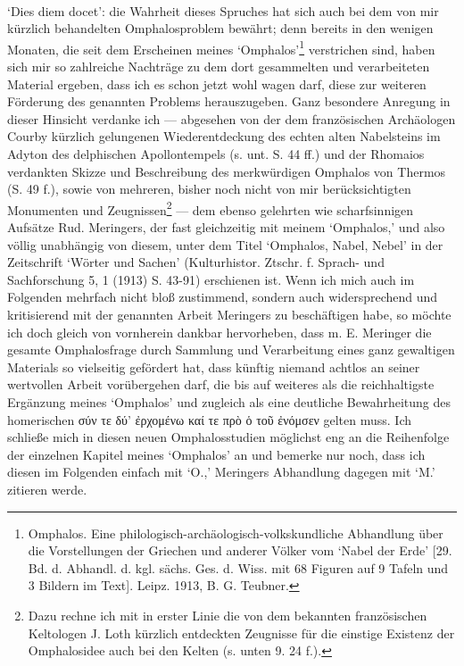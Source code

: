 \documentclass[a4paper, 11pt, oneside]{article}
\begin{document}
\paragraph{}
`Dies diem docet': die Wahrheit dieses Spruches hat sich auch bei dem von mir kürzlich behandelten Omphalosproblem bewährt; denn bereits in den wenigen Monaten, die seit dem Erscheinen meines `Omphalos'\footnote{Omphalos. Eine philologisch-archäologisch-volkskundliche Abhandlung über die Vorstellungen der Griechen und anderer Völker vom `Nabel der Erde' [29. Bd. d. Abhandl. d. kgl. sächs. Ges. d. Wiss. mit 68 Figuren auf 9 Tafeln und 3 Bildern im Text]. Leipz. 1913, B. G. Teubner.} verstrichen sind, haben sich mir so zahlreiche Nachträge zu dem dort gesammelten und verarbeiteten Material ergeben, dass ich es schon jetzt wohl wagen darf, diese zur weiteren Förderung des genannten Problems herauszugeben. Ganz besondere Anregung in dieser Hinsicht verdanke ich --- abgesehen von der dem französischen Archäologen Courby kürzlich gelungenen Wiederentdeckung des echten alten Nabelsteins im Adyton des delphischen Apollontempels (s. unt. S. 44 ff.) und der Rhomaios verdankten Skizze und Beschreibung des merkwürdigen Omphalos von Thermos (S. 49 f.), sowie von mehreren, bisher noch nicht von mir berücksichtigten Monumenten und Zeugnissen\footnote{Dazu rechne ich mit in erster Linie die von dem bekannten französischen Keltologen J. Loth kürzlich entdeckten Zeugnisse für die einstige Existenz der Omphalosidee auch bei den Kelten (s. unten 9. 24 f.).} --- dem ebenso gelehrten wie scharfsinnigen Aufsätze Rud. Meringers, der fast gleichzeitig mit meinem `Omphalos,' und also völlig unabhängig von diesem, unter dem Titel `Omphalos, Nabel, Nebel' in der Zeitschrift `Wörter und Sachen' (Kulturhistor. Ztschr. f. Sprach- und Sachforschung 5, 1 (1913) S. 43-91) erschienen ist. Wenn ich mich auch im Folgenden mehrfach nicht bloß zustimmend, sondern auch widersprechend und kritisierend mit der genannten Arbeit Meringers zu beschäftigen habe, so möchte ich doch gleich von vornherein dankbar hervorheben, dass m. E. Meringer die gesamte Omphalosfrage durch Sammlung und Verarbeitung eines ganz gewaltigen Materials so vielseitig gefördert hat, dass künftig niemand achtlos an seiner wertvollen Arbeit vorübergehen darf, die bis auf weiteres als die reichhaltigste Ergänzung meines `Omphalos' und zugleich als eine deutliche Bewahrheitung des homerischen σύν τε δύ' ἐρχομένω καί τε πρὸ ὁ τοῦ ἐνόμσεν gelten muss. Ich schließe mich in diesen neuen Omphalosstudien möglichst eng an die Reihenfolge der einzelnen Kapitel meines `Omphalos' an und bemerke nur noch, dass ich diesen im Folgenden einfach mit `O.,' Meringers Abhandlung dagegen mit `M.' zitieren werde.
\clearpage
\end{document}
